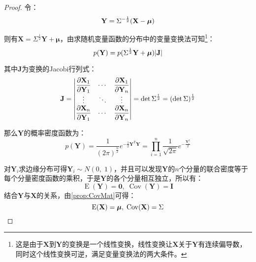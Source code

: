 \begin{proof}
	令：
	\begin{equation}
		\mathbf{Y}=\Sigma^{-\frac{1}{2}}(\mathbf{X}-\boldsymbol{\mu})\notag
	\end{equation}\par
	则有$\mathbf{X}=\Sigma^{\frac{1}{2}}\mathbf{Y}+\boldsymbol{\mu}$，由求随机变量函数的分布中的变量变换法可知\footnote{这是由于$\mathbf{X}$到$\mathbf{Y}$的变换是一个线性变换，线性变换让$\mathbf{X}$关于$\mathbf{Y}$有连续偏导数，同时这个线性变换可逆，满足变量变换法的两大条件。}：
	\begin{equation}
		p(\mathbf{Y})=p(\Sigma^{\frac{1}{2}}\mathbf{Y}+\boldsymbol{\mu})|\mathbf{J}|\notag
	\end{equation}\par
	其中$\mathbf{J}$为变换的Jacobi行列式：
	\begin{equation}
		\mathbf{J}=
		\begin{vmatrix}
			\dfrac{\partial \mathbf{X}_1}{\partial \mathbf{Y}_1} & \cdots & \dfrac{\partial \mathbf{X}_1}{\partial \mathbf{Y}_n} \\
			\vdots & \ddots & \vdots \\
			\dfrac{\partial \mathbf{X}_n}{\partial \mathbf{Y}_1} & \cdots & \dfrac{\partial \mathbf{X}_n}{\partial \mathbf{Y}_n}
		\end{vmatrix}
		=\det\Sigma^{\frac{1}{2}}=(\det\Sigma)^{\frac{1}{2}}\notag
	\end{equation}\par
	那么$\mathbf{Y}$的概率密度函数为：
	\begin{equation*}
		p(\mathbf{Y})
		=\frac{1}{(2\pi)^{\frac{n}{2}}}e^{-\frac{1}{2}               \mathbf{Y}^T\mathbf{Y}}
		=\prod_{i=1}^n\frac{1}{\sqrt{2\pi}}e^{-\frac{\mathbf{Y}_i^2}{2}}
	\end{equation*}\par
	对$\mathbf{Y}_i$求边缘分布可得$\mathbf{Y}_i\sim N(0,\;1)$，并且可以发现$\mathbf{Y}$的$n$个分量的联合密度等于每个分量密度函数的乘积，于是$\mathbf{Y}$的各个分量相互独立，所以有：
	\begin{equation*}
		\operatorname{E}(\mathbf{Y})=\mathbf{0},\;\operatorname{Cov}(\mathbf{Y})=\mathbf{I}
	\end{equation*}
	结合$\mathbf{Y}$与$\mathbf{X}$的关系，由\cref{prop:CovMat}可得：
	\begin{equation*}
		\operatorname{E}(\mathbf{X})=\boldsymbol{\mu},\;\operatorname{Cov}(\mathbf{X})=\Sigma \qedhere
	\end{equation*}
\end{proof}
